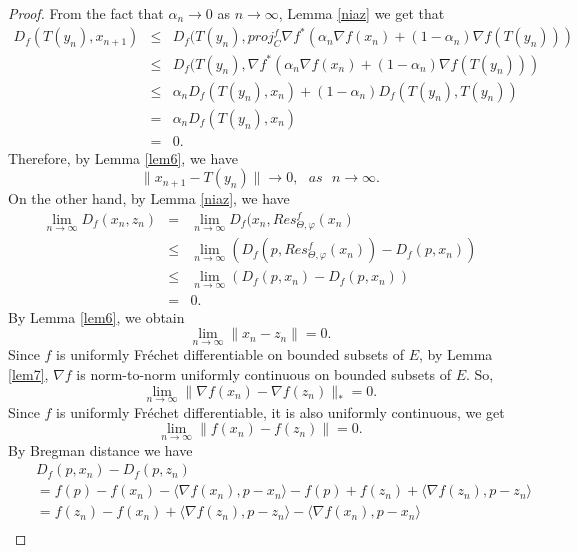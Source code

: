 \documentclass[reqno,b5paper]{amsart}
\theoremstyle{plain}
\theoremstyle{definition}
\numberwithin{equation}{section}
\numberwithin{equation}{section}
\begin{document}
\begin{proof}
From the fact that $\alpha_{n}\to0$ as $n\to\infty$, Lemma \ref{niaz}   
 we get that
\begin{eqnarray*}
D_{f}(T(y_{n}),x_{n+1})&\leq& D_{f}(T(y_{n}),proj_{C}^{f}\nabla f^{*}(\alpha_{n}\nabla f(x_{n})+(1-\alpha_{n})\nabla f (T(y_{n})))\\
&\leq&D_{f}(T(y_{n}), \nabla f^{*}(\alpha_{n}\nabla f(x_{n})+(1-\alpha_{n})\nabla f (T(y_{n})))\\
&\leq& \alpha_{n}D_{f}(T(y_{n}), x_{n})+(1-\alpha_{n})D_{f}(T(y_{n}),T(y_{n}))\\
&=&\alpha_{n}D_{f}(T(y_{n}), x_{n})\\
&=&0.
\end{eqnarray*}
Therefore, by Lemma \ref{lem6}, we have
\begin{equation}\label{rd}
\|x_{n+1}-T(y_{n})\|\to0, \ \ \ as \ \ \ n\to\infty.
\end{equation}
On the other hand, by Lemma \ref{niaz}, we have
\begin{eqnarray*}
\lim_{n\to\infty} D_{f}(x_{n},z_{n})&=&\lim_{n\to\infty} D_{f}(x_{n},Res_{\Theta,\varphi}^{f}(x_{n})\\
&\leq& \lim_{n\to\infty}(D_{f}(p,Res_{\Theta,\varphi}^{f}(x_{n}))-D_{f}(p,x_{n}))\\
&\leq& \lim_{n\to\infty}(D_{f}(p,x_{n})-D_{f}(p,x_{n}))\\
&=&0.
\end{eqnarray*}
By Lemma \ref{lem6}, we obtain
\begin{equation}\label{3.8}
\lim_{n\to\infty}\|x_{n}-z_{n}\|=0.
\end{equation}
Since $f$ is  uniformly Fr\'{e}chet differentiable on bounded subsets of $E$, by Lemma \ref{lem7}, $\nabla f$ is norm-to-norm uniformly continuous on bounded subsets of $E$. So,
\begin{equation}\label{3.9}
\lim_{n\to\infty}\|\nabla f(x_{n})-\nabla f(z_{n})\|_{*}=0.
\end{equation}
Since $f$ is uniformly Fr\'{e}chet differentiable, it is also uniformly continuous, we get
\begin{equation}\label{3.10}
\lim_{n\to\infty}\|f(x_{n})-f(z_{n})\|=0.
\end{equation}
By Bregman distance we have
\begin{eqnarray*}
&&D_{f}(p,x_{n})-D_{f}(p,z_{n})\\
&&=f(p)-f(x_{n})-\langle \nabla f(x_{n}),p-x_{n}\rangle -f(p)+f(z_{n})+\langle \nabla f(z_{n}),p-z_{n}\rangle\\
&&=f(z_{n})-f(x_{n})+\langle \nabla f(z_{n}),p-z_{n}\rangle-\langle \nabla f(x_{n}),p-x_{n}\rangle\\

\end{eqnarray*}
\end{proof}
\end{document}

